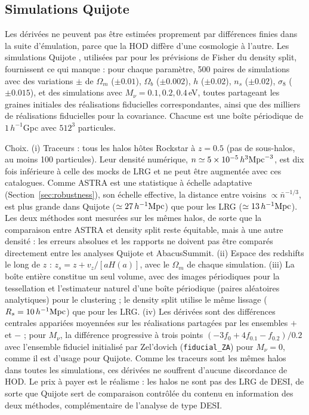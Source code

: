 \subsection{Simulations Quijote}
\label{sec:quijote_sims}

Les dérivées ne peuvent pas être estimées proprement par différences finies dans la suite d'émulation, parce que la HOD diffère d'une cosmologie à l'autre. Les simulations Quijote \cite{Quijote}, utilisées par \cite{Paillas2023} pour les prévisions de Fisher du density split, fournissent ce qui manque : pour chaque paramètre, 500 paires de simulations avec des variations $\pm$ de $\Omega_m$ ($\pm0.01$), $\Omega_b$ ($\pm0.002$), $h$ ($\pm0.02$), $n_s$ ($\pm0.02$), $\sigma_8$ ($\pm0.015$), et des simulations avec $M_\nu = 0.1, 0.2, 0.4$\,eV, toutes partageant les graines initiales des réalisations fiducielles correspondantes, ainsi que des milliers de réalisations fiducielles pour la covariance. Chacune est une boîte périodique de $1\,h^{-1}$Gpc avec $512^3$ particules.

Choix. (i) Traceurs : tous les halos hôtes Rockstar à $z=0.5$ (pas de sous-halos, au moins 100 particules). Leur densité numérique, $n\simeq5\times10^{-5}\,h^3{\rm Mpc}^{-3}$, est dix fois inférieure à celle des mocks de LRG et ne peut être augmentée avec ces catalogues. Comme ASTRA est une statistique à échelle adaptative (Section~\ref{sec:robustness}), son échelle effective, la distance entre voisins $\propto\bar n^{-1/3}$, est plus grande dans Quijote ($\simeq27\,h^{-1}\mathrm{Mpc}$) que pour les LRG ($\simeq13\,h^{-1}\mathrm{Mpc}$). Les deux méthodes sont mesurées sur les mêmes halos, de sorte que la comparaison entre ASTRA et density split reste équitable, mais à une autre densité : les erreurs absolues et les rapports ne doivent pas être comparés directement entre les analyses Quijote et AbacusSummit. (ii) Espace des redshifts le long de $z$ : $z_s = z + v_z/[aH(a)]$, avec le $\Omega_m$ de chaque simulation. (iii) La boîte entière constitue un seul volume, avec des images périodiques pour la tessellation et l'estimateur naturel d'une boîte périodique (paires aléatoires analytiques) pour le clustering ; le density split utilise le même lissage ($R_s=10\,h^{-1}\mathrm{Mpc}$) que pour les LRG. (iv) Les dérivées sont des différences centrales appariées moyennées sur les réalisations partagées par les ensembles $+$ et $-$ ; pour $M_\nu$, la différence progressive à trois points $(-3f_0+4f_{0.1}-f_{0.2})/0.2$ avec l'ensemble fiduciel initialisé par Zel'dovich (\texttt{fiducial\_ZA}) pour $M_\nu=0$, comme il est d'usage pour Quijote. Comme les traceurs sont les mêmes halos dans toutes les simulations, ces dérivées ne souffrent d'aucune discordance de HOD. Le prix à payer est le réalisme : les halos ne sont pas des LRG de DESI, de sorte que Quijote sert de comparaison contrôlée du contenu en information des deux méthodes, complémentaire de l'analyse de type DESI.

